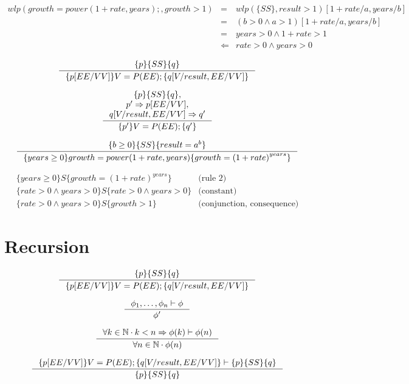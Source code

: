 \documentclass[12pt, a4paper]{book}
\begin{document}
  \begin{eqnarray*}
      wlp(growth=power(1+rate, years);, growth > 1) & = & wlp(\{SS\}, result > 1)[1+rate/a, years/b] \\
      & = & (b >0 \land a > 1)[1+rate/a, years/b] \\
      & = & years > 0 \land 1+rate > 1 \\
      & \Leftarrow & rate > 0 \land years > 0
  \end{eqnarray*}

  $$
  \inference{\{p\}\{SS\}\{q\}}
  {\{p[EE/VV]\} V=P(EE); \{q[V/result, EE/VV]\}}
  $$

  $$
  \inference{
    \{p\}\{SS\}\{q\}, \\
    p' \Rightarrow p[EE/VV], \\
    q[V/result, EE/VV] \Rightarrow q'
  }
  {\{p'\} V=P(EE); \{q'\}}
  $$

  $$
  \inference{\{ b \ge 0\}\{SS\}\{result = a^{b}\}}
  {\{years \ge 0\} growth=power(1+rate, years)\{growth={(1+rate)}^{years}\}}
  $$

  \begin{eqnarray*}
      \{years \ge 0\} S \{growth = {(1+rate)}^{years}\} & \textrm{(rule 2)} \\
      \{rate > 0 \land years > 0 \} S \{rate > 0 \land years > 0\} & \textrm{(constant)} \\
      \{rate > 0 \land years > 0 \} S \{growth > 1 \} & \textrm{(conjunction, consequence)}
  \end{eqnarray*}

  \section{Recursion}
  \label{sec:Recursion}

  

  $$
  \inference{\{p\}\{SS\}\{q\}}
  {\{p[EE/VV]\} V=P(EE); \{q[V/result, EE/VV]\}}
  $$

  $$
  \inference{\phi_{1},\ldots,\phi_{n} \vdash \phi}
  {\phi'}
  $$

  $$
  \inference{\forall k \in \mathbb{N} \cdot k < n \Rightarrow \phi(k) \vdash \phi(n)}
  {\forall n \in \mathbb{N} \cdot \phi(n)}
  $$

  $$
  \inference{\{p[EE/VV]\} V=P(EE); \{q[V/result, EE/VV]\} \vdash \{p\}\{SS\}\{q\}}
  {\{p\}\{SS\}\{q\}}
  $$
\end{document}
